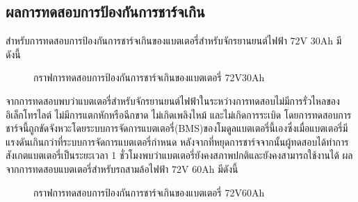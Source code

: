 \subsection{ผลการทดสอบการป้องกันการชาร์จเกิน}
สำหรับการทดสอบการป้องกันการชาร์จเกินของแบตเตอรี่สำหรับจักรยานยนต์ไฟฟ้า 72V 30Ah มีดังนี้
\begin{center}
	\begin{figure}[H]
		\centering
		\captionsetup{justification=centering,margin=2cm}
		\caption{กราฟการทดสอบการป้องกันการชาร์จเกินของแบตเตอรี่ 72V30Ah}
	\end{figure}
\end{center}
จากการทดสอบพบว่าแบตเตอรี่สำหรับจักรยานยนต์ไฟฟ้าในระหว่างการทดสอบไม่มีการรั่วไหลของ\\อิเล็กโทรไลต์ ไม่มีการแตกหักหรือฉีกขาด ไม่เกิดเพลิงไหม้ และไม่เกิดการระเบิด
โดยการทดสอบการชาร์จนี้ถูกขัดจังหวะโดยระบบการจัดการแบตเตอรี่(BMS)ของโมดูลแบตเตอรี่นี้เองซึ่งเมื่อแบตเตอรี่มีแรงดันเกินกว่าที่ระบบการจัดการแบตเตอรี่กำหนด
หลังจากที่หยุดการชาร์จจากนั้นผู้ทดสอบได้ทำการสังเกตแบตเตอรี่เป็นระยะเวลา 1 ชั่วโมงพบว่าแบตเตอรี่ยังคงสภาพปกติและยังคงสามารถใช้งานได้
\newline\hspace*{2cm}
ผลจากการทดสอบแบตเตอรี่สำหรับรถสามล้อไฟฟ้า 72V 60Ah มีดังนี้
\begin{center}
	\begin{figure}[H]
		\centering
		\captionsetup{justification=centering,margin=2cm}
		\caption{กราฟการทดสอบการป้องกันการชาร์จเกินของแบตเตอรี่ 72V60Ah}
	\end{figure}
\end{center}
